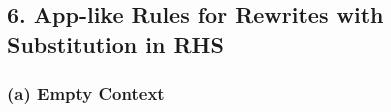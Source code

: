 \documentclass{article}
\begin{document}
\begin{prooftree}
\end{prooftree}

\begin{prooftree}
\end{prooftree}

\begin{prooftree}
\end{prooftree}

\begin{prooftree}
\end{prooftree}

\begin{prooftree}
\end{prooftree}

\begin{prooftree}
\end{prooftree}

\subsection*{6. App-like Rules for Rewrites with Substitution in RHS}

\subsubsection*{(a) Empty Context}

\begin{prooftree}
\end{prooftree}
\end{document}
